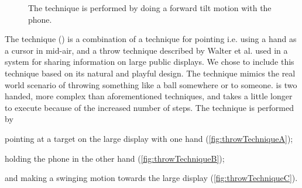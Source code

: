 \begin{figure}[H]
\caption{The \tilt technique is performed by doing a forward tilt motion with the phone.}
\label{fig:tiltTechnique}
\end{figure}

The \throw technique () is a combination of a technique for pointing \cite{Scheible:2008} i.e. using a hand as a cursor in mid-air, and a throw technique described by Walter et al. \cite{Walter:2014} used in a system for sharing information on large public displays.
We chose to include this technique based on its natural and playful design.
The technique mimics the real world scenario of throwing something like a ball somewhere or to someone.
\throw is two handed, more complex than aforementioned techniques, and takes a little longer to execute because of the increased number of steps.
The \throw technique is performed by 
\begin{enumerate*}[label=\itshape\roman*\upshape)]
	\item{pointing at a target on the large display with one hand (\cref{fig:throwTechniqueA});}
	\item{holding the phone in the other hand (\cref{fig:throwTechniqueB});}
	\item{and making a swinging motion towards the large display (\cref{fig:throwTechniqueC}).}
\end{enumerate*}

